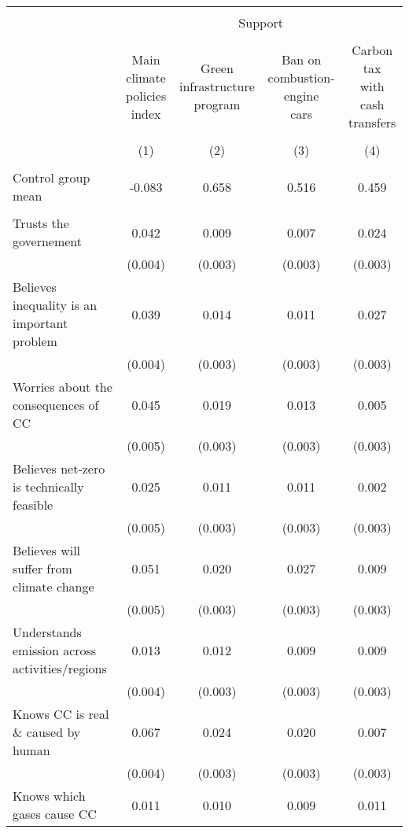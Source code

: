 
\begin{tabular}{@{\extracolsep{5pt}}lcccc} 
\\[-1.8ex]\hline 
\hline \\[-1.8ex] 
 & \multicolumn{4}{c}{Support} \\ 
\cline{2-5} 
\\[-1.8ex] & \makecell{Main climate\\policies index} & \makecell{Green\\infrastructure\\program} & \makecell{Ban on\\combustion-engine\\cars} & \makecell{Carbon tax\\with\\cash transfers} \\ 
\\[-1.8ex] & (1) & (2) & (3) & (4)\\ 
\hline \\[-1.8ex] 
Control group mean & -0.083 & 0.658 & 0.516 & 0.459  \\ \hline \\[-1.8ex]
 Trusts the governement & 0.042 & 0.009 & 0.007 & 0.024 \\ 
  & (0.004) & (0.003) & (0.003) & (0.003) \\ 
  Believes inequality is an important problem & 0.039 & 0.014 & 0.011 & 0.027 \\ 
  & (0.004) & (0.003) & (0.003) & (0.003) \\ 
  Worries about the consequences of CC & 0.045 & 0.019 & 0.013 & 0.005 \\ 
  & (0.005) & (0.003) & (0.003) & (0.003) \\ 
  Believes net-zero is technically feasible & 0.025 & 0.011 & 0.011 & 0.002 \\ 
  & (0.005) & (0.003) & (0.003) & (0.003) \\ 
  Believes will suffer from climate change & 0.051 & 0.020 & 0.027 & 0.009 \\ 
  & (0.005) & (0.003) & (0.003) & (0.003) \\ 
  Understands emission across activities/regions & 0.013 & 0.012 & 0.009 & 0.009 \\ 
  & (0.004) & (0.003) & (0.003) & (0.003) \\ 
  Knows CC is real \& caused by human & 0.067 & 0.024 & 0.020 & 0.007 \\ 
  & (0.004) & (0.003) & (0.003) & (0.003) \\ 
  Knows which gases cause CC & 0.011 & 0.010 & 0.009 & 0.011 \\ 

\end{tabular}
